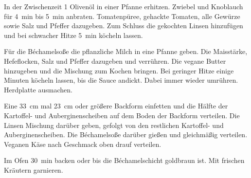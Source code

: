 \begin{recipe}
{        \step In der Zwischenzeit \SI{1}{\EL} Olivenöl in einer Pfanne erhitzen. Zwiebel und Knoblauch für \ca \SI{4}{\minute} bis \SI{5}{\minute} anbraten. Tomatenpüree, gehackte Tomaten, alle Gewürze sowie Salz und Pfeffer dazugeben. Zum Schluss die gekochten Linsen hinzufügen und bei schwacher Hitze \ca \SI{5}{\minute} köcheln lassen.

        \step Für die Béchamelsoße die pflanzliche Milch in eine Pfanne geben. Die Maisstärke, Hefeflocken, Salz und Pfeffer dazugeben und verrühren. Die vegane Butter hinzugeben und die Mischung zum Kochen bringen. Bei geringer Hitze einige Minuten köcheln lassen, bis die Sauce andickt. Dabei immer wieder umrühren. Herdplatte ausmachen.

        \step Eine \SI{33}{\cm} mal \SI{23}{\cm} oder größere Backform einfetten und die Hälfte der Kartoffel- und Auberginenscheiben auf dem Boden der Backform verteilen. Die Linsen Mischung darüber geben, gefolgt von den restlichen Kartoffel- und Auberginenscheiben. Die Béchamelsoße darüber gießen und gleichmäßig verteilen. Veganen Käse nach Geschmack oben drauf verteilen.

        \step Im Ofen \ca \SI{30}{\minute} backen oder bis die Béchamelschicht goldbraun ist. Mit frischen Kräutern garnieren.
    }



\end{recipe}
\endgroup
